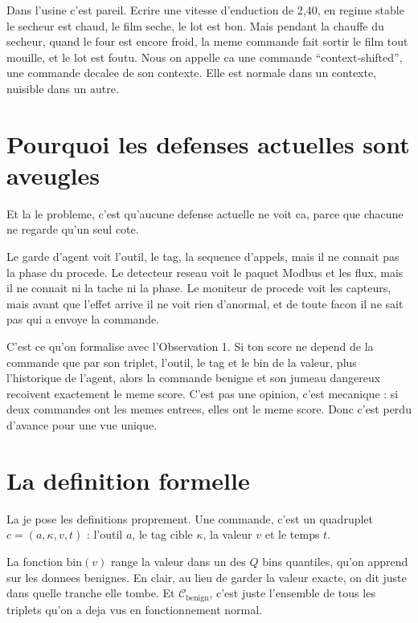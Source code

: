 \documentclass[11pt]{article}
\begin{document}
Dans l'usine c'est pareil. Ecrire une vitesse d'enduction de 2,40, en regime
stable le secheur est chaud, le film seche, le lot est bon. Mais pendant la chauffe
du secheur, quand le four est encore froid, la meme commande fait sortir le film
tout mouille, et le lot est foutu. Nous on appelle ca une commande
``context-shifted'', une commande decalee de son contexte. Elle est normale dans un
contexte, nuisible dans un autre.

\section{Pourquoi les defenses actuelles sont aveugles}
Et la le probleme, c'est qu'aucune defense actuelle ne voit ca, parce que chacune
ne regarde qu'un seul cote.

Le garde d'agent voit l'outil, le tag, la sequence d'appels, mais il ne connait pas
la phase du procede. Le detecteur reseau voit le paquet Modbus et les flux, mais il
ne connait ni la tache ni la phase. Le moniteur de procede voit les capteurs, mais
avant que l'effet arrive il ne voit rien d'anormal, et de toute facon il ne sait
pas qui a envoye la commande.

C'est ce qu'on formalise avec l'Observation 1. Si ton score ne depend de la commande
que par son triplet, l'outil, le tag et le bin de la valeur, plus l'historique de
l'agent, alors la commande benigne et son jumeau dangereux recoivent exactement le
meme score. C'est pas une opinion, c'est mecanique : si deux commandes ont les memes
entrees, elles ont le meme score. Donc c'est perdu d'avance pour une vue unique.

\section{La definition formelle}
La je pose les definitions proprement. Une commande, c'est un quadruplet
\(c = (a, \kappa, v, t)\) : l'outil \(a\), le tag cible \(\kappa\), la valeur \(v\)
et le temps \(t\).

La fonction \(\mathrm{bin}(v)\) range la valeur dans un des \(Q\) bins quantiles,
qu'on apprend sur les donnees benignes. En clair, au lieu de garder la valeur
exacte, on dit juste dans quelle tranche elle tombe. Et \(\mathcal{C}_{\text{benign}}\),
c'est juste l'ensemble de tous les triplets qu'on a deja vus en fonctionnement
normal.
\end{document}
